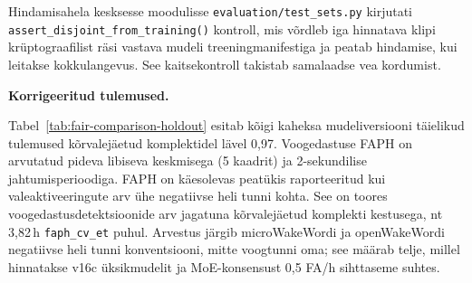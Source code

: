 Hindamisahela kesksesse moodulisse \texttt{evaluation/test\_sets.py} kirjutati \texttt{assert\_disjoint\_from\_training()} kontroll, mis võrdleb iga hinnatava klipi krüptograafilist räsi vastava mudeli treeningmanifestiga ja peatab hindamise, kui leitakse kokkulangevus. See kaitsekontroll takistab samalaadse vea kordumist.

\medskip
\noindent\textbf{Korrigeeritud tulemused.}

Tabel~\ref{tab:fair-comparison-holdout} esitab kõigi kaheksa mudeliversiooni täielikud tulemused kõrvalejäetud komplektidel lävel 0,97. Voogedastuse FAPH on arvutatud pideva libiseva keskmisega (5 kaadrit) ja 2-sekundilise jahtumisperioodiga. FAPH on käesolevas peatükis raporteeritud kui valeaktiveeringute arv ühe negatiivse heli tunni kohta. See on toores voogedastusdetektsioonide arv jagatuna kõrvalejäetud komplekti kestusega, nt 3,82\,h \texttt{faph\_cv\_et} puhul. Arvestus järgib microWakeWordi ja openWakeWordi negatiivse heli tunni konventsiooni, mitte voogtunni oma; see määrab telje, millel hinnatakse v16c üksikmudelit ja MoE-konsensust 0,5 FA/h sihttaseme suhtes.

\begin{table}[H]
\centering
\caption{Mudeliversioonide korrigeeritud võrdlus kõrvalejäetud hindamiskomplektidel (lävi\,=\,0,97). Parim tulemus igas reas on \textbf{paksus kirjas}; v8 Mac-mikrofoni positiivne mõõtmine puudub, sest vastav komplekt oli treeningus. UV tähistab Wilsoni 95\% usaldusvahemikku ning FAPH on raporteeritud skriptitud taasmängu variandina (vt §\ref{subsec:faph-variants}). HN tähistab sihtfraasiga sarnaste negatiivnäidete komplekti --- nt \enquote{Hei Kratt}, \enquote{Tere Kratt} ---, mille peal mõõdetakse FPR-i.}
\label{tab:fair-comparison-holdout}
\setlength{\tabcolsep}{3pt}
\scriptsize
{}
\end{table}

